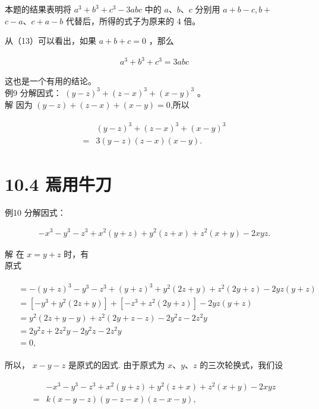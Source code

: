 \documentclass[10pt]{article}
\begin{document}
本题的结果表明将 $a^{3}+b^{3}+c^{3}-3 a b c$ 中的 $a 、 b 、 c$ 分别用 $a+b-c, b+$ $c-a 、 c+a-b$ 代替后，所得的式子为原来的 4 倍。

从（13）可以看出，如果 $a+b+c=0$ ，那么

\begin{align*}
a^{3}+b^{3}+c^{3}=3 a b c
\end{align*}

这也是一个有用的结论。\\
例9 分解因式： $(y-z)^{3}+(z-x)^{3}+(x-y)^{3}$ 。\\
解 因为 $(y-z)+(z-x)+(x-y)=0$,所以

\begin{align*}
\begin{aligned}
& (y-z)^{3}+(z-x)^{3}+(x-y)^{3} \\
= & 3(y-z)(z-x)(x-y) .
\end{aligned}
\end{align*}

\section*{10.4 焉用牛刀}
例10 分解因式：

\begin{align*}
-x^{3}-y^{3}-z^{3}+x^{2}(y+z)+y^{2}(z+x)+z^{2}(x+y)-2 x y z .
\end{align*}

解 在 $x=y+z$ 时，有\\
原式

\begin{align*}
\begin{aligned}
& =-(y+z)^{3}-y^{3}-z^{3}+(y+z)^{3}+y^{2}(2 z+y)+z^{2}(2 y+z)-2 y z(y+z) \\
& =\left[-y^{3}+y^{2}(2 z+y)\right]+\left[-z^{3}+z^{2}(2 y+z)\right]-2 y z(y+z) \\
& =y^{2}(2 z+y-y)+z^{2}(2 y+z-z)-2 y^{2} z-2 z^{2} y \\
& =2 y^{2} z+2 z^{2} y-2 y^{2} z-2 z^{2} y \\
& =0,
\end{aligned}
\end{align*}

所以， $x-y-z$ 是原式的因式. 由于原式为 $x 、 y 、 z$ 的三次轮换式，我们设

\begin{align*}
\begin{aligned}
& -x^{3}-y^{3}-z^{3}+x^{2}(y+z)+y^{2}(z+x)+z^{2}(x+y)-2 x y z \\
= & k(x-y-z)(y-z-x)(z-x-y),
\end{aligned}
\end{align*}
\end{document}
